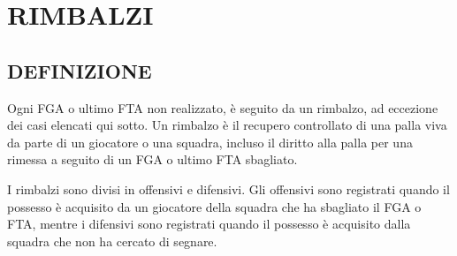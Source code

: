 \section{RIMBALZI}
\sectionline

\subsection{DEFINIZIONE}
\subsectionline

Ogni FGA o ultimo FTA non realizzato, è seguito da un rimbalzo, ad eccezione dei casi elencati qui sotto. Un rimbalzo è il recupero controllato di una palla viva da parte di un giocatore o una squadra, incluso il diritto alla palla per una rimessa a seguito di un FGA o ultimo FTA sbagliato.

I rimbalzi sono divisi in offensivi e difensivi. Gli offensivi sono registrati quando il possesso è acquisito da un giocatore della squadra che ha sbagliato il FGA o FTA, mentre i difensivi sono registrati quando il possesso è acquisito dalla squadra che non ha cercato di segnare.

